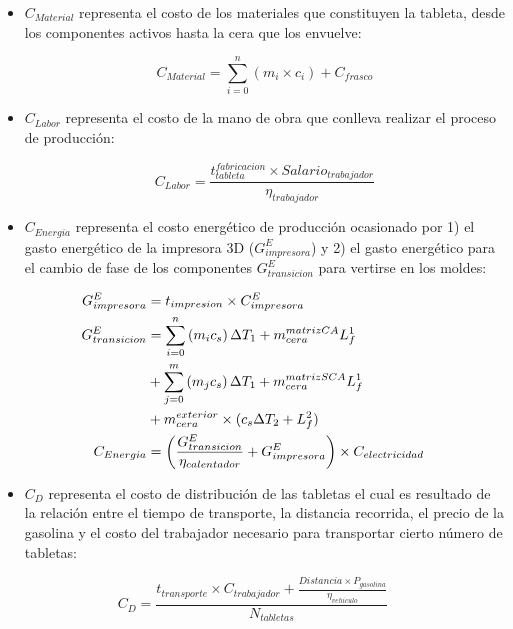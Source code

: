 \documentclass[
]{book}
\providecommand{\tightlist}{%
  \setlength{\itemsep}{0pt}\setlength{\parskip}{0pt}}
\begin{document}
\begin{itemize}
\item
  \(C_{Material}\) representa el costo de los materiales que constituyen
  la tableta, desde los componentes activos hasta la cera que los
  envuelve:

  \begin{equation}
  C_{Material}=\sum_{i=0}^n\left(m_i \times c_i \right) + C_{frasco}
  \label{eq:costomaterial}
  \end{equation}
\item
  \(C_{Labor}\) representa el costo de la mano de obra que conlleva
  realizar el proceso de producción:

  \begin{equation}
  C_{Labor}=\frac{t_{tableta}^{fabricacion} \times Salario_{trabajador}}
  {\eta_{trabajador}}
  \label{eq:costolabor}
  \end{equation}
\item
  \(C_{Energia}\) representa el costo energético de producción
  ocasionado por 1) el gasto energético de la impresora 3D
  (\(G_{impresora}^E\)) y 2) el gasto energético para el cambio de fase
  de los componentes \(G_{transicion}^E\) para vertirse en los moldes:
\end{itemize}

\begin{align}
  G_{impresora}^E & = t_{impresion} \times C_{impresora}^E \notag \\
  G_{transicion}^E & = \sum_{i=0}^n\left(m_i c_s\right)\Delta T_1 + 
  m_{cera}^{matrizCA}L_f^1 \notag \\
  & + \sum_{j=0}^m\left(m_j c_s\right)\Delta T_1 + m_{cera}^{matrizSCA}L_f^1
  \notag \\
  & + m_{cera}^{exterior} \times (c_s\Delta T_2 + L_f^2) \notag \\
  C_{Energia} & = \left(\frac{G_{transicion}^E}{\eta_{calentador}}
  +G_{impresora}^E \right) \times C_{electricidad} \label{eq:costoenergetico}
\end{align}

\begin{itemize}
\tightlist
\item
  \(C_D\) representa el costo de distribución de las tabletas el cual es
  resultado de la relación entre el tiempo de transporte, la distancia
  recorrida, el precio de la gasolina y el costo del trabajador
  necesario para transportar cierto número de tabletas:
\end{itemize}

    \begin{equation}
    C_D = \frac{t_{transporte} \times C_{trabajador} + \frac{Distancia \times 
    P_{gasolina}}{\eta_{vehiculo}}}{N_{tabletas}} 
    \label{eq:costodistribucion}
    \end{equation}
\end{document}
